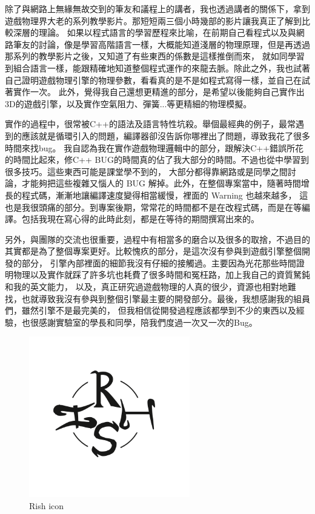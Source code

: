 除了與網路上無緣無故交到的筆友和議程上的講者，我也透過講者的關係下，拿到遊戲物理界大老的系列教學影片。那短短兩三個小時幾部的影片讓我真正了解到比較深層的理論。
如果以程式語言的學習歷程來比喻，在前期自己看程式以及與網路筆友的討論，像是學習高階語言一樣，大概能知道淺層的物理原理，但是再透過那系列的教學影片之後，又知道了有些東西的係數是這樣推倒而來，
就如同學習到組合語言一樣，能跟精確地知道整個程式運作的來龍去脈。除此之外，我也試著自己證明遊戲物理引擎的物理參數，看看真的是不是如程式寫得一樣，並自己在試著實作一次。
此外，覺得我自己還想更精進的部分，是希望以後能夠自己實作出3D的遊戲引擎，以及實作空氣阻力、彈簧...等更精細的物理模擬。

實作的過程中，很常被C++的語法及語言特性坑殺。舉個最經典的例子，最常遇到的應該就是循環引入的問題，編譯器卻沒告訴你哪裡出了問題，導致我花了很多時間來找bug。
我自認為我在實作遊戲物理邏輯中的部分，跟解決C++錯誤所花的時間比起來，修C++ BUG的時間真的佔了我大部分的時間。不過也從中學習到很多技巧。這些東西可能是課堂學不到的，
大部分都得靠網路或是同學之間討論，才能夠把這些複雜又惱人的 BUG 解掉。此外，在整個專案當中，隨著時間增長的程式碼，漸漸地讓編譯速度變得相當緩慢，裡面的 Warning 也越來越多，
這也是我很頭痛的部分。到專案後期，常常花的時間都不是在改程式碼，而是在等編譯。包括我現在寫心得的此時此刻，都是在等待的期間撰寫出來的。

另外，與團隊的交流也很重要，過程中有相當多的磨合以及很多的取捨，不過目的其實都是為了整個專案更好。比較愧疚的部分，是這次沒有參與到遊戲引擎整個開發的部分，
引擎內部裡面的細節我沒有仔細的接觸過。主要因為光花那些時間證明物理以及實作就踩了許多坑也耗費了很多時間和冤枉路，加上我自己的資質駑鈍和我的英文能力，
以及，真正研究過遊戲物理的人真的很少，資源也相對地難找，也就導致我沒有參與到整個引擎最主要的開發部分。最後，我想感謝我的組員們，雖然引擎不是最完美的，
但我相信從開發過程應該都學到不少的東西以及經驗，也很感謝實驗室的學長和同學，陪我們度過一次又一次的Bug。

\begin{figure}[h]
	\begin{center}
	\includegraphics[height=7cm]{./resources/rish_2.png}
	\end{center}
\caption{Rish icon}
\label{fig:RishIcon}
\end{figure}
\newpage